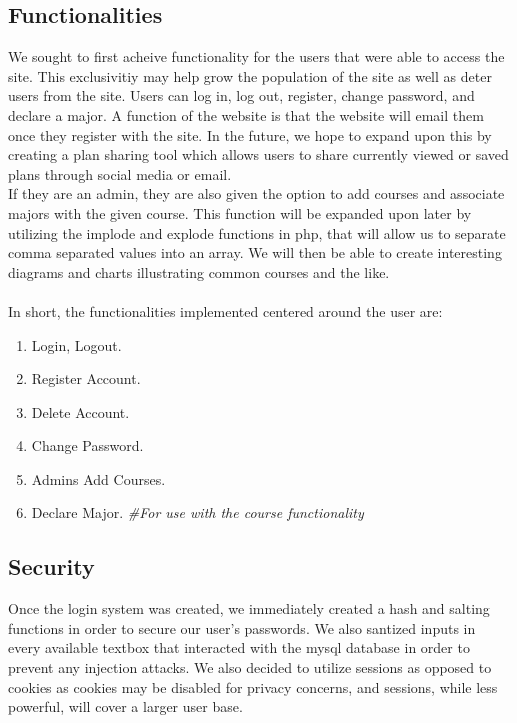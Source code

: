 \documentclass{article}
\begin{document}
\begin{doublespace}
\subsection*{Functionalities}
\indent We sought to first acheive functionality for the users that were able to access the site. This exclusivitiy may help grow the population of the site as well as deter users from the site. Users can log in, log out, register, change password, and declare a major. A function of the website is that the website will email them once they register with the site. In the future, we hope to expand upon this by creating a plan sharing tool which allows users to share currently viewed or saved plans through social media or email. \\
\indent If they are an admin, they are also given the option to add courses and associate majors with the given course. This function will be expanded upon later by utilizing the implode and explode functions in php, that will allow us to separate comma separated values into an array. We will then be able to create interesting diagrams and charts illustrating common courses and the like.\\
\\
\indent In short, the functionalities implemented centered around the user are:
\begin{enumerate}
\item Login, Logout.\\
\item Register Account.\\
\item Delete Account.
\item Change Password.\\
\item Admins Add Courses.\\
\item Declare Major. \emph{\#For use with the course functionality}\\
\end{enumerate}

\subsection*{Security}
\indent Once the login system was created, we immediately created a hash and salting functions in order to secure our user's passwords. We also santized inputs in every available textbox that interacted with the mysql database in order to prevent any injection attacks. We also decided to utilize sessions as opposed to cookies as cookies may be disabled for privacy concerns, and sessions, while less powerful, will cover a larger user base.


\end{doublespace}
\end{document}
